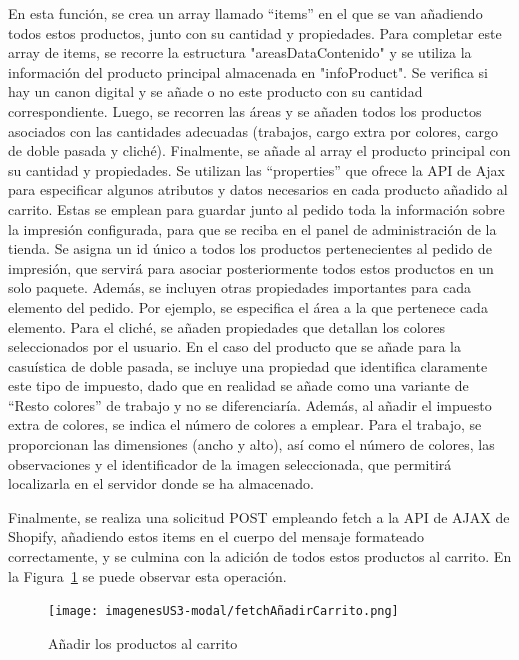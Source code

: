 \documentclass[11pt]{article}
\begin{document}
En esta función, se crea un array llamado ``items'' en el que se van añadiendo todos estos productos, junto con su cantidad 
y propiedades. Para completar este array de items, se recorre la estructura "areasDataContenido" y se utiliza la información del producto principal 
almacenada en "infoProduct". Se verifica si hay un canon digital y se añade o no este producto con su cantidad correspondiente. Luego, se recorren las
áreas y se añaden todos los productos asociados con las cantidades adecuadas (trabajos, cargo extra por colores, cargo de doble pasada y cliché). 
Finalmente, se añade al array el producto principal con su cantidad y propiedades. Se utilizan las ``properties'' que ofrece la API de Ajax para especificar 
algunos atributos y datos necesarios en cada producto añadido al carrito. Estas se emplean para guardar junto al pedido toda la información sobre la impresión 
configurada, para que se reciba en el panel de administración de la tienda. Se asigna un id único a todos los productos pertenecientes 
al pedido de impresión, que servirá para asociar posteriormente todos estos productos en un solo paquete. Además, se incluyen otras propiedades importantes
para cada elemento del pedido. Por ejemplo, se especifica el área a la que pertenece cada elemento. Para el cliché, se añaden 
propiedades que detallan los colores seleccionados por el usuario. En el caso del producto que se añade para la casuística de doble pasada, se incluye una
propiedad que identifica claramente este tipo de impuesto, dado que en realidad se añade como una variante de ``Resto colores'' de trabajo y no se diferenciaría. Además, 
al añadir el impuesto extra de colores, se indica el número de colores a emplear. Para el trabajo, se proporcionan las dimensiones (ancho y alto), 
así como el número de colores, las observaciones y el identificador de la imagen seleccionada, que permitirá localizarla en el servidor donde se ha almacenado.

Finalmente, se realiza una solicitud POST empleando fetch a la API de AJAX de Shopify, añadiendo estos items en el cuerpo 
del mensaje formateado correctamente, y se culmina con la adición de todos estos productos al carrito. En la Figura~\ref{fig:addCarritoFuncion} se puede
observar esta operación.

\begin{figure}[H]
    \centering
    \texttt{[image: imagenesUS3-modal/fetchAñadirCarrito.png]}
    \caption{\label{fig:addCarritoFuncion} Añadir los productos al carrito}
    \vspace{\fill}
\end{figure}
\end{document}
